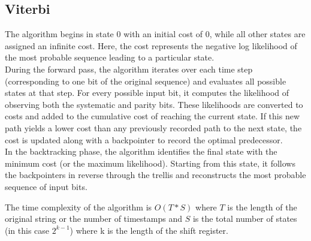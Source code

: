 \begin{center}
\end{center}

\subsection{Viterbi}
The algorithm begins in state $0$ with an initial cost of $0$, while all other 
states are assigned an infinite cost. Here, the cost represents the negative 
log likelihood of the most probable sequence leading to a particular state. 
\\During the forward pass, the algorithm iterates over each time step 
(corresponding to one bit of the original sequence) and evaluates all possible 
states at that step. For every possible input bit, it computes the likelihood of 
observing both the systematic and parity bits. These likelihoods are converted 
to costs and added to the cumulative cost of reaching the current state. If this 
new path yields a lower cost than any previously recorded path to the next state, 
the cost is updated along with a backpointer to record the optimal predecessor. 
\\In the backtracking phase, the algorithm identifies the final state with the 
minimum cost (or the maximum likelihood). Starting from 
this state, it follows the backpointers in reverse through the trellis and
reconstructs the most probable sequence of input bits.

The time complexity of the algorithm is $O(T * S)$ where $T$ is the length of the original string or the number of timestamps and $S$ is the total number of states (in this case $2^{k - 1}$) where k is the length of the shift register.

